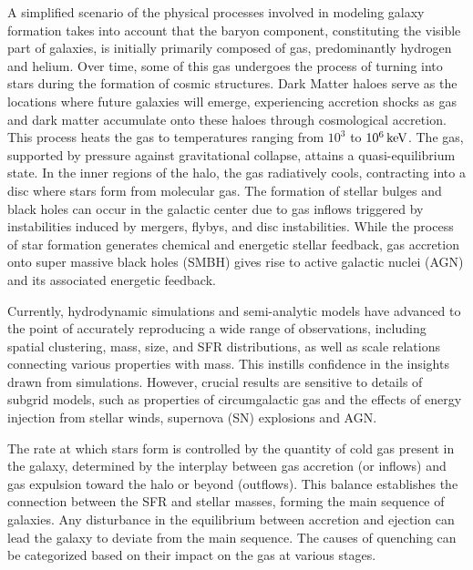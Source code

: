 \documentclass[baaa]{baaa}
\begin{document}
A simplified scenario of the physical processes involved in modeling galaxy formation takes into account that the baryon component, constituting the visible part of galaxies, is initially primarily composed of gas, predominantly hydrogen and helium. Over time, some of this gas undergoes the process of turning into stars during the formation of cosmic structures. Dark Matter haloes serve as the locations where future galaxies will emerge, experiencing accretion shocks as gas and dark matter accumulate onto these haloes through cosmological accretion. This process heats the gas to temperatures ranging from $10^3$ to $10^6\,{\rm keV}$. The gas, supported by pressure against gravitational collapse, attains a quasi-equilibrium state. In the inner regions of the halo, the gas radiatively cools, contracting into a disc where stars form from molecular gas. 
The formation of stellar bulges and black holes can occur in the galactic center due to gas inflows triggered by instabilities induced by mergers, flybys, and disc instabilities. 
 While the process of star formation generates chemical and energetic stellar feedback, gas accretion onto super massive black holes (SMBH) gives rise to active galactic nuclei (AGN) and its associated energetic feedback. 

Currently, hydrodynamic simulations and semi-analytic models have advanced to the point of accurately reproducing a wide range of observations, including spatial clustering, mass, size, and SFR distributions, as well as scale relations connecting various properties with mass. This instills confidence in the insights drawn from simulations. However, crucial results are sensitive to details of subgrid models, such as properties of circumgalactic gas and the effects of energy injection from stellar winds, supernova (SN) explosions and AGN.

The rate at which stars form is controlled by the quantity of cold gas present in the galaxy, determined by the interplay between gas accretion (or inflows) and gas expulsion toward the halo or beyond (outflows). This balance establishes the connection between the SFR and stellar masses, forming the main sequence of galaxies.
Any disturbance in the equilibrium between accretion and ejection can lead the galaxy to deviate from the main sequence. The causes of quenching can be categorized based on their impact on the gas at various stages. 
\end{document}

